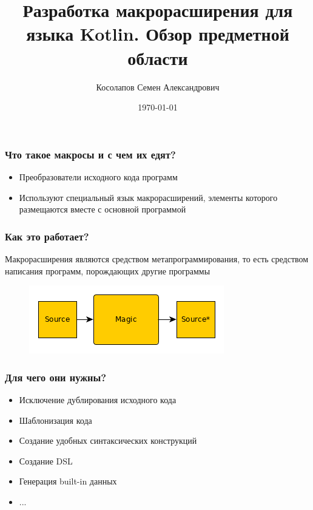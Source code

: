 \documentclass[11pt]{beamer}
\author[Косолапов С.А.]{Косолапов Семен Александрович}
\title[Современные проблемы ИиВТ]{Разработка макрорасширения для языка Kotlin. Обзор предметной области}
\date{\today}
\institute[СПбПУ]{}
\begin{document}
\begin{frame}
\titlepage
\end{frame}


\begin{frame}
\frametitle{Что такое макросы и с чем их едят?}

\begin{itemize}
	\item Преобразователи исходного кода программ
	\item Используют специальный язык макрорасширений, элементы которого размещаются вместе с основной программой
\end{itemize}

\end{frame}

\begin{frame}
\frametitle{Как это работает?}

Макрорасширения являются средством метапрограммирования, то есть средством написания программ, порождающих другие программы

\begin{figure}[H]
	\begin{center}
		\includegraphics[scale=0.75]{pic/macro-work.png}
	\end{center}
\end{figure}

\end{frame}

\begin{frame}
\frametitle{Для чего они нужны?}

\begin{itemize}
	\item Исключение дублирования исходного кода
	\item Шаблонизация кода
	\item Создание удобных синтаксических конструкций
	\item Создание DSL
	\item Генерация built-in данных
	\item ...
\end{itemize}

\end{frame}
\end{document}
